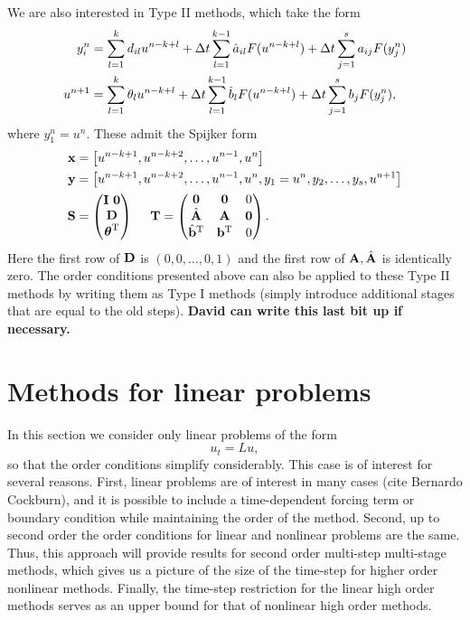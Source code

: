 \documentclass[12pt]{article}
\begin{document}
We are also interested in Type II methods, which take the form
\begin{subequations} \label{eq:mrk-typeII}
\begin{align}
y_i^n & = \sum_{l=1}^{k} d_{il} u^{n-k+l} + \Delta t\sum_{l=1}^{k-1} \hat{a}_{il} F(u^{n-k+l}) + \Delta t\sum_{j=1}^s a_{ij} F(y_j^n) \\
u^{n+1} & = \sum_{l=1}^{k} \theta_l u^{n-k+l} + \Delta t\sum_{l=1}^{k-1} \hat{b}_{l} F(u^{n-k+l}) + \Delta t\sum_{j=1}^s b_j F(y_j^n),
\end{align}
\end{subequations}
where $y_1^n=u^n$.  These admit the Spijker form
\begin{align}
\mathbf{x} & = \left[u^{n-k+1},u^{n-k+2},\dots,u^{n-1},u^n\right] \\
\mathbf{y} & = \left[u^{n-k+1},u^{n-k+2},\dots,u^{n-1},u^n,y_1=u^{n},y_2,\dots,y_s,u^{n+1}\right] \\
\mathbf{S} & = \begin{pmatrix}\mathbf{I} \ \mathbf{0} \\ \mathbf{D} \\\boldsymbol{\theta}^\mathrm{T} \end{pmatrix} \ \ \ \
\mathbf{T}   = \begin{pmatrix}\mathbf{0} & \mathbf{0} & 0 \\ \hat{\mathbf{A}} & \mathbf{A} & \mathbf{0} \\ \hat{\mathbf{b}}^\mathrm{T} & \mathbf{b}^\mathrm{T} & 0 \end{pmatrix}.
\end{align}
Here the first row of $\mathbf{D}$ is $(0,0,\dots,0,1)$ and the first row of
$\mathbf{A},\hat{\mathbf{A}}$ is identically zero.
The order conditions presented above can also be applied to these Type II methods
by writing them as Type I methods (simply introduce additional stages that are
equal to the old steps).  {\bf David can write this last bit up if necessary.}

\section{Methods for linear problems}
In this section we consider only linear problems of the form $$u_t = L u,$$
so that the order conditions simplify considerably.  This case is of 
interest for several reasons.  First, linear problems are of interest in many 
cases (cite Bernardo Cockburn), and it is possible to include a time-dependent 
forcing term or boundary condition while maintaining the order of the method. 
Second, up to second order  the order conditions for  linear and nonlinear
problems are the same.  Thus, this approach will provide results for second 
order multi-step multi-stage methods, which gives us a picture of the size 
of the time-step for higher order nonlinear methods.  Finally, the time-step 
restriction for the linear high order methods serves as an upper bound for 
that of nonlinear high order methods. 
\end{document}
